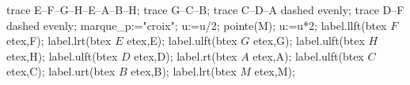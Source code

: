 \begin{exercice*}[Quadrillage]
\begin{enumerate}
\begin{center}
\begin{Geometrie}[CoinBG={(.5u,.5u)},CoinHD={(5u,4u)}]
                trace E--F--G--H--E--A--B--H;
                trace G--C--B;
                trace C--D--A dashed evenly;
                trace D--F dashed evenly;
                marque_p:="croix";
                u:=u/2;
                pointe(M);
                u:=u*2;
                label.llft(btex $F$ etex,F);
                label.lrt(btex $E$ etex,E);
                label.ulft(btex $G$ etex,G);
                label.ulft(btex $H$ etex,H);
                label.ulft(btex $D$ etex,D);
                label.rt(btex $A$ etex,A);
                label.ulft(btex $C$ etex,C);
                label.urt(btex $B$ etex,B);
                label.lrt(btex $M$ etex,M);
            \end{Geometrie}
        \end{center}
    \end{enumerate}
\end{exercice*}
